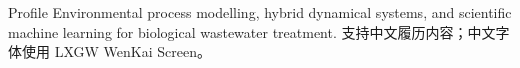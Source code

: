 \begin{rubric}{Profile}
\entry*[Research] Environmental process modelling, hybrid dynamical systems, and scientific machine learning for biological wastewater treatment.
\entry*[中文] 支持中文履历内容；中文字体使用 LXGW WenKai Screen。
\end{rubric}
